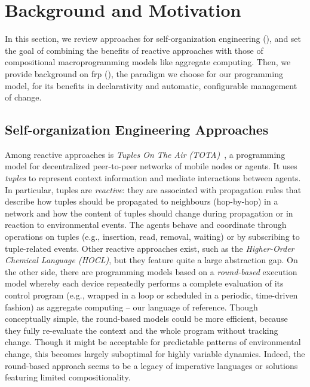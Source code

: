 \section{Background and Motivation}\label{acsos2023-frp:sec:background}
In this section,
 we review approaches for self-organization engineering (),
 and set the goal of combining the benefits of reactive approaches
with those of compositional macroprogramming models like aggregate computing.
%
Then, we provide background on \ac{frp} (),
 the paradigm we choose for our programming model,
 for its benefits in declarativity and
 automatic, configurable management of change.

\subsection{Self-organization Engineering Approaches}
\label{acsos2023-frp:sec:background:selforg}
Among reactive approaches is \emph{Tuples On The Air (TOTA)}~\cite{tota},
 a programming model for decentralized peer-to-peer networks of mobile nodes or agents.
%
It uses \emph{tuples} to represent context information 
 and mediate interactions between agents.
%
In particular, tuples are \emph{reactive}: 
 they are associated with propagation rules that describe how tuples 
 should be propagated to neighbours (hop-by-hop) in a network and how the
 content of tuples should change during propagation
 or in reaction to environmental events. 
%
The agents behave and coordinate
 through operations on tuples (e.g., insertion, read, removal, waiting) or by subscribing to tuple-related events.
%
Other reactive approaches exist, 
 such as the \emph{Higher-Order Chemical Language (HOCL)}\cite{DBLP:journals/ijuc/BanatreFR07},
 but they feature quite a large abstraction gap.
%
On the other side, there are programming models 
 based on a \emph{round-based} execution model
 whereby 
 each device repeatedly performs a complete evaluation of its control program
 (e.g., wrapped in a loop or scheduled in a periodic, time-driven fashion) as aggregate computing -- our language of reference.
%
Though conceptually simple,
 the round-based models could be more efficient,
 because they fully re-evaluate the context
 and the whole program
 without tracking change.
%
Though it might be acceptable for predictable patterns of environmental change,
  this becomes largely suboptimal for highly variable dynamics.
%
Indeed,
 the round-based approach seems to be a legacy of imperative languages or solutions featuring limited compositionality.

